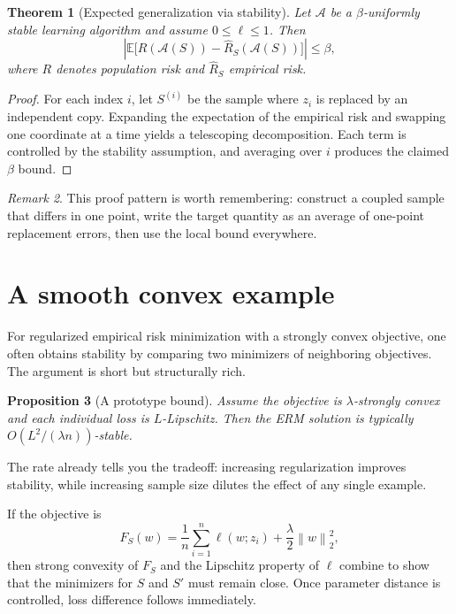 \documentclass[11pt]{article}
\theoremstyle{plain}
\newtheorem{theorem}{Theorem}[section]
\newtheorem{proposition}[theorem]{Proposition}
\theoremstyle{definition}
\theoremstyle{remark}
\newtheorem{remark}[theorem]{Remark}
\newcommand{\E}{\mathbb{E}}
\newcommand{\norm}[1]{\left\lVert #1 \right\rVert}
\begin{document}
\begin{theorem}[Expected generalization via stability]
Let $\mathcal{A}$ be a $\beta$-uniformly stable learning algorithm and assume $0 \le \ell \le 1$. Then
\[
\left| \E\bigl[R(\mathcal{A}(S)) - \widehat{R}_S(\mathcal{A}(S))\bigr] \right| \le \beta,
\]
where $R$ denotes population risk and $\widehat{R}_S$ empirical risk.
\end{theorem}

\begin{proof}
For each index $i$, let $S^{(i)}$ be the sample where $z_i$ is replaced by an independent copy. Expanding the expectation of the empirical risk and swapping one coordinate at a time yields a telescoping decomposition. Each term is controlled by the stability assumption, and averaging over $i$ produces the claimed $\beta$ bound.
\end{proof}

\begin{remark}
This proof pattern is worth remembering: construct a coupled sample that differs in one point, write the target quantity as an average of one-point replacement errors, then use the local bound everywhere.
\end{remark}

\section{A smooth convex example}

For regularized empirical risk minimization with a strongly convex objective, one often obtains stability by comparing two minimizers of neighboring objectives. The argument is short but structurally rich.

\begin{proposition}[A prototype bound]
Assume the objective is $\lambda$-strongly convex and each individual loss is $L$-Lipschitz. Then the ERM solution is typically $O(L^2/(\lambda n))$-stable.
\end{proposition}

\begin{InsightBox}
The rate already tells you the tradeoff: increasing regularization improves stability, while increasing sample size dilutes the effect of any single example.
\end{InsightBox}

\begin{ExampleBox}
If the objective is
\[
F_S(w)=\frac{1}{n}\sum_{i=1}^n \ell(w;z_i)+\frac{\lambda}{2}\norm{w}_2^2,
\]
then strong convexity of $F_S$ and the Lipschitz property of $\ell$ combine to show that the minimizers for $S$ and $S'$ must remain close. Once parameter distance is controlled, loss difference follows immediately.
\end{ExampleBox}
\end{document}
